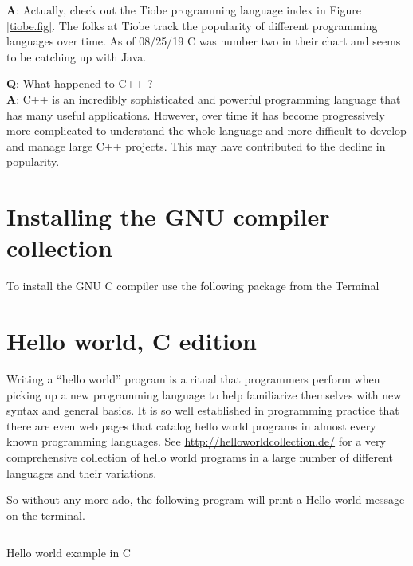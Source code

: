 
{\bf A}: Actually, check out the Tiobe programming language index in Figure \ref{tiobe.fig}. The folks at Tiobe track the popularity of different programming languages over time. As of 08/25/19 C was number two in their chart and seems to be catching up with Java.

{\bf Q}: What happened to C++ ?\\
{\bf A}: C++ is an incredibly sophisticated and powerful programming language that has many useful applications. However, over time it has become progressively more complicated to understand the whole language and more difficult to develop and manage large C++ projects. This may have contributed to the decline in popularity.

\section{Installing the GNU compiler collection}

To install the GNU C compiler use the following package from the Terminal 



\section{Hello world, C edition}

Writing a ``hello world'' program is a ritual that programmers perform when picking up a new programming language to help familiarize themselves with new syntax and general basics. It is so well established in programming practice that there are even web pages that catalog hello world programs in almost every known programming languages. See \href{http://helloworldcollection.de/}{http://helloworldcollection.de/} for a very comprehensive collection of hello world programs in a large number of different languages and their variations.

So without any more ado, the following program will print a Hello world message on the terminal.

\begin{listing}[ht]
\inputminted{c}{code/L06/helloWorld.c}
\caption{Hello world example in C}
\label{helloWorld.list}
\end{listing}

